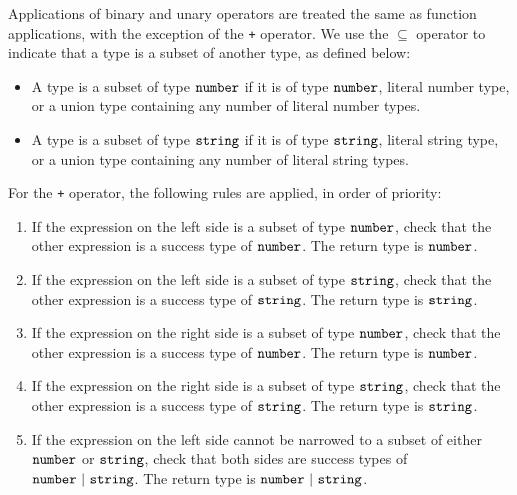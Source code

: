 Applications of binary and unary operators are treated the same as function applications, with the exception of the \texttt{+} operator.
We use the $\subseteq$ operator to indicate that a type is a subset of another type, as defined below:

\begin{itemize}
\item{A type is a subset of type $\texttt{number}$ if it is of type $\texttt{number}$, literal number type,
  or a union type containing any number of literal number types.}
\item{A type is a subset of type $\texttt{string}$ if it is of type $\texttt{string}$, literal string type,
  or a union type containing any number of literal string types.}
\end{itemize}

For the \texttt{+} operator, the following rules are applied, in order of priority:

\begin{enumerate}
\item{If the expression on the left side is a subset of type $\texttt{number}$,
  check that the other expression is a success type of $\texttt{number}$. The return type is $\texttt{number}$.}
\item{If the expression on the left side is a subset of type $\texttt{string}$,
  check that the other expression is a success type of $\texttt{string}$. The return type is $\texttt{string}$.}
\item{If the expression on the right side is a subset of type $\texttt{number}$,
  check that the other expression is a success type of $\texttt{number}$. The return type is $\texttt{number}$.}
\item{If the expression on the right side is a subset of type $\texttt{string}$,
  check that the other expression is a success type of $\texttt{string}$. The return type is $\texttt{string}$.}
\item{If the expression on the left side cannot be narrowed to a subset of either $\texttt{number}$ or $\texttt{string}$, check that both sides are success types of 
  $\Number\ |\ \String$. The return type is $\Number\ |\ \String$.}
\end{enumerate}

